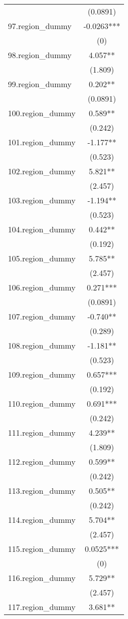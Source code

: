 \documentclass[]{article}
\begin{document}
\begin{tabular}{lc}
 & (0.0891) \\
97.region\_dummy & -0.0263*** \\
 & (0) \\
98.region\_dummy & 4.057** \\
 & (1.809) \\
99.region\_dummy & 0.202** \\
 & (0.0891) \\
100.region\_dummy & 0.589** \\
 & (0.242) \\
101.region\_dummy & -1.177** \\
 & (0.523) \\
102.region\_dummy & 5.821** \\
 & (2.457) \\
103.region\_dummy & -1.194** \\
 & (0.523) \\
104.region\_dummy & 0.442** \\
 & (0.192) \\
105.region\_dummy & 5.785** \\
 & (2.457) \\
106.region\_dummy & 0.271*** \\
 & (0.0891) \\
107.region\_dummy & -0.740** \\
 & (0.289) \\
108.region\_dummy & -1.181** \\
 & (0.523) \\
109.region\_dummy & 0.657*** \\
 & (0.192) \\
110.region\_dummy & 0.691*** \\
 & (0.242) \\
111.region\_dummy & 4.239** \\
 & (1.809) \\
112.region\_dummy & 0.599** \\
 & (0.242) \\
113.region\_dummy & 0.505** \\
 & (0.242) \\
114.region\_dummy & 5.704** \\
 & (2.457) \\
115.region\_dummy & 0.0525*** \\
 & (0) \\
116.region\_dummy & 5.729** \\
 & (2.457) \\
117.region\_dummy & 3.681** \\

\end{tabular}
\end{document}
